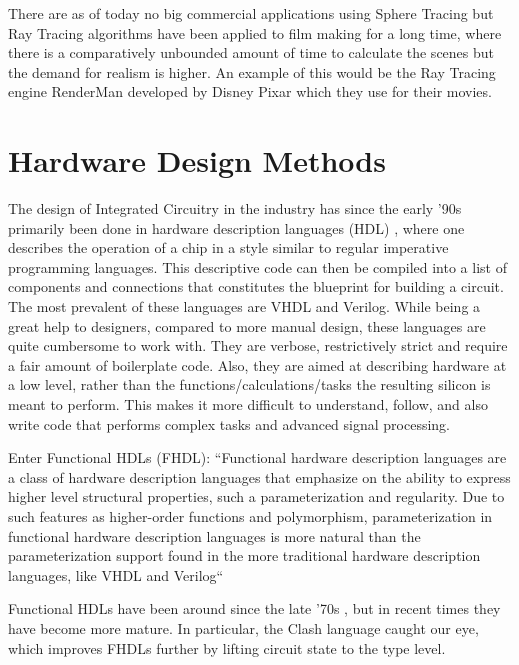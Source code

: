 There are as of today no big commercial applications using Sphere Tracing but
Ray Tracing algorithms have been applied to film making for a long time, where
there is a comparatively unbounded amount of time to calculate the scenes but
the demand for realism is higher. An example of this would be the Ray Tracing
engine RenderMan developed by Disney Pixar which they use for their
movies.\cite{TODO}

\section{ Hardware Design Methods } 

The design of Integrated Circuitry in the industry has since the early '90s 
primarily been done in hardware description languages (HDL) \cite{ChenG}, 
where one describes the operation of a chip in a style similar to regular 
imperative programming languages. This descriptive code can then be compiled 
into a list of components and connections that constitutes the blueprint for 
building a circuit. The most prevalent of these languages are VHDL and 
Verilog. While being a great help to designers, compared to more manual 
design, these languages are quite cumbersome to work with. They are verbose, 
restrictively strict and require a fair amount of boilerplate code. Also, 
they are aimed at describing hardware at a low level, rather than the 
functions/calculations/tasks the resulting silicon is meant to perform. This 
makes it more difficult to understand, follow, and also write code that 
performs complex tasks and advanced signal processing.

Enter Functional HDLs (FHDL): ``Functional hardware description languages are a class of hardware description languages that emphasize on the ability to express higher level structural properties, such a parameterization and regularity.  Due to such features as higher-order functions and polymorphism, parameterization in functional hardware description languages is more natural than the parameterization support found in the more traditional hardware description languages, like VHDL and Verilog`` \cite{Baaij2009}

Functional HDLs have been around since the late '70s \cite{Chen2012}, but in 
recent times they have become more mature. In particular, the Clash language
caught our eye, which improves FHDLs further by lifting circuit state to the 
type level.
